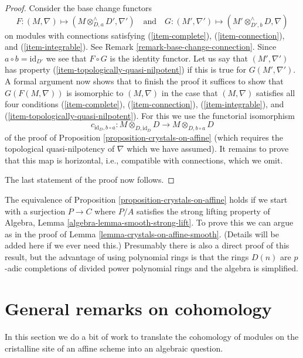 \begin{proof}
\medskip\noindent
Consider the base change functors
$$
F : (M, \nabla) \longmapsto
(M \otimes^\wedge_{D, a} D', \nabla')
\quad\text{and}\quad
G : (M', \nabla') \longmapsto
(M' \otimes^\wedge_{D', b} D, \nabla)
$$
on modules with connections satisfying (\ref{item-complete}),
(\ref{item-connection}), and (\ref{item-integrable}).
See Remark \ref{remark-base-change-connection}.
Since $a \circ b = \text{id}_{D'}$ we see that
$F \circ G$ is the identity functor. Let us say that $(M', \nabla')$
has property (\ref{item-topologically-quasi-nilpotent}) if this
is true for $G(M', \nabla')$. A formal argument now shows that to finish
the proof it suffices to show that $G(F(M, \nabla))$ is isomorphic
to $(M, \nabla)$ in the case that $(M, \nabla)$ satisfies all four
conditions (\ref{item-complete}), (\ref{item-connection}),
(\ref{item-integrable}), and (\ref{item-topologically-quasi-nilpotent}).
For this we use the functorial isomorphism
$$
c_{\text{id}_D, b \circ a} :
M \otimes_{D, \text{id}_D} D
\longrightarrow
M \otimes_{D, b \circ a} D
$$
of the proof of Proposition \ref{proposition-crystals-on-affine}
(which requires the topological quasi-nilpotency of $\nabla$
which we have assumed).
It remains to prove that this map is horizontal, i.e.,
compatible with connections, which we omit.

\medskip\noindent
The last statement of the proof now follows.
\end{proof}

\begin{remark}
\label{remark-equivalence-more-general}
The equivalence of Proposition \ref{proposition-crystals-on-affine}
holds if we start with a surjection $P \to C$ where $P/A$ satisfies the
strong lifting property of
Algebra, Lemma \ref{algebra-lemma-smooth-strong-lift}.
To prove this we can argue as in the proof of
Lemma \ref{lemma-crystals-on-affine-smooth}.
(Details will be added here if we ever need this.)
Presumably there is also a direct proof of this result, but the advantage
of using polynomial rings is that the rings $D(n)$ are $p$-adic completions
of divided power polynomial rings and the algebra is simplified.
\end{remark}



\section{General remarks on cohomology}
\label{section-cohomology-lqc}

\noindent
In this section we do a bit of work to translate the cohomology
of modules on the cristalline site of an affine scheme into
an algebraic question.

